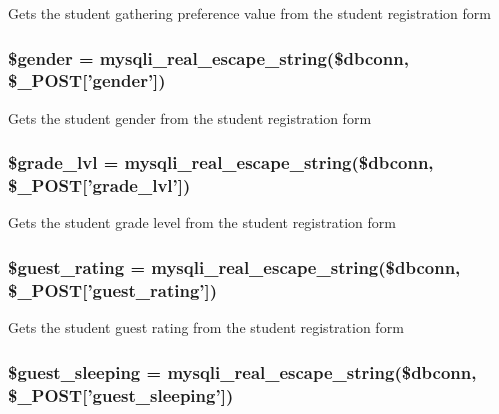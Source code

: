 \-Gets the student gathering preference value from the student registration form \hypertarget{user__view_2validate_2studentVal_8php_a0f1d7cfb9dc6f494b9014885205fc47e}{
\subsubsection[{\$gender}]{\setlength{\rightskip}{0pt plus 5cm}\$gender = mysqli\-\_\-real\-\_\-escape\-\_\-string(\$dbconn, \$\-\_\-\-P\-O\-S\-T\mbox{[}'gender'\mbox{]})}}\label{user__view_2validate_2studentVal_8php_a0f1d7cfb9dc6f494b9014885205fc47e}
\-Gets the student gender from the student registration form \hypertarget{user__view_2validate_2studentVal_8php_a379014f2a48154febd53d5f95871dc14}{
\subsubsection[{\$grade\-\_\-lvl}]{\setlength{\rightskip}{0pt plus 5cm}\$grade\-\_\-lvl = mysqli\-\_\-real\-\_\-escape\-\_\-string(\$dbconn, \$\-\_\-\-P\-O\-S\-T\mbox{[}'grade\-\_\-lvl'\mbox{]})}}\label{user__view_2validate_2studentVal_8php_a379014f2a48154febd53d5f95871dc14}
\-Gets the student grade level from the student registration form \hypertarget{user__view_2validate_2studentVal_8php_ade1951cffb40e000076f5d81e34e41d8}{
\subsubsection[{\$guest\-\_\-rating}]{\setlength{\rightskip}{0pt plus 5cm}\$guest\-\_\-rating = mysqli\-\_\-real\-\_\-escape\-\_\-string(\$dbconn, \$\-\_\-\-P\-O\-S\-T\mbox{[}'guest\-\_\-rating'\mbox{]})}}\label{user__view_2validate_2studentVal_8php_ade1951cffb40e000076f5d81e34e41d8}
\-Gets the student guest rating from the student registration form \hypertarget{user__view_2validate_2studentVal_8php_a30ca6680bf78675c5916e0c0114191fb}{
\subsubsection[{\$guest\-\_\-sleeping}]{\setlength{\rightskip}{0pt plus 5cm}\$guest\-\_\-sleeping = mysqli\-\_\-real\-\_\-escape\-\_\-string(\$dbconn, \$\-\_\-\-P\-O\-S\-T\mbox{[}'guest\-\_\-sleeping'\mbox{]})}}\label{user__view_2validate_2studentVal_8php_a30ca6680bf78675c5916e0c0114191fb}
